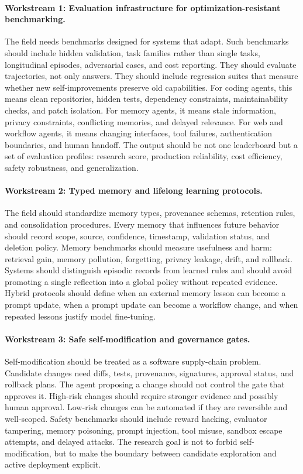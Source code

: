 \paragraph{Workstream 1: Evaluation infrastructure for optimization-resistant benchmarking.}
The field needs benchmarks designed for systems that adapt. Such benchmarks should include hidden validation, task families rather than single tasks, longitudinal episodes, adversarial cases, and cost reporting. They should evaluate trajectories, not only answers. They should include regression suites that measure whether new self-improvements preserve old capabilities. For coding agents, this means clean repositories, hidden tests, dependency constraints, maintainability checks, and patch isolation. For memory agents, it means stale information, privacy constraints, conflicting memories, and delayed relevance. For web and workflow agents, it means changing interfaces, tool failures, authentication boundaries, and human handoff. The output should be not one leaderboard but a set of evaluation profiles: research score, production reliability, cost efficiency, safety robustness, and generalization.

\paragraph{Workstream 2: Typed memory and lifelong learning protocols.}
The field should standardize memory types, provenance schemas, retention rules, and consolidation procedures. Every memory that influences future behavior should record scope, source, confidence, timestamp, validation status, and deletion policy. Memory benchmarks should measure usefulness and harm: retrieval gain, memory pollution, forgetting, privacy leakage, drift, and rollback. Systems should distinguish episodic records from learned rules and should avoid promoting a single reflection into a global policy without repeated evidence. Hybrid protocols should define when an external memory lesson can become a prompt update, when a prompt update can become a workflow change, and when repeated lessons justify model fine-tuning.

\paragraph{Workstream 3: Safe self-modification and governance gates.}
Self-modification should be treated as a software supply-chain problem. Candidate changes need diffs, tests, provenance, signatures, approval status, and rollback plans. The agent proposing a change should not control the gate that approves it. High-risk changes should require stronger evidence and possibly human approval. Low-risk changes can be automated if they are reversible and well-scoped. Safety benchmarks should include reward hacking, evaluator tampering, memory poisoning, prompt injection, tool misuse, sandbox escape attempts, and delayed attacks. The research goal is not to forbid self-modification, but to make the boundary between candidate exploration and active deployment explicit.

